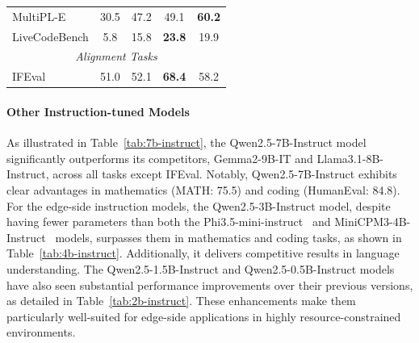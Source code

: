 \begin{table}[t]
\begin{tabular}{@{}lcccc@{}}
MultiPL-E & 30.5 & 47.2 & 49.1 & \textbf{60.2} \\

LiveCodeBench & 5.8 & 15.8 & \textbf{23.8} & 19.9 \\

\midrule

\multicolumn{5}{c}{\textit{Alignment Tasks}} \\

\midrule

IFEval & 51.0 & 52.1 & \textbf{68.4} & 58.2 \\

\bottomrule

\end{tabular}

\end{table}


\paragraph{Other Instruction-tuned Models} 
As illustrated in Table~\ref{tab:7b-instruct}, the Qwen2.5-7B-Instruct model significantly outperforms its competitors, Gemma2-9B-IT and Llama3.1-8B-Instruct, across all tasks except IFEval. Notably, Qwen2.5-7B-Instruct exhibits clear advantages in mathematics (MATH: 75.5) and coding (HumanEval: 84.8).
For the edge-side instruction models, the Qwen2.5-3B-Instruct model, despite having fewer parameters than both the Phi3.5-mini-instruct~\citep{phi3} and MiniCPM3-4B-Instruct~\citep{minicpm} models, surpasses them in mathematics and coding tasks, as shown in Table~\ref{tab:4b-instruct}. Additionally, it delivers competitive results in language understanding.
The Qwen2.5-1.5B-Instruct and Qwen2.5-0.5B-Instruct models have also seen substantial performance improvements over their previous versions, as detailed in Table~\ref{tab:2b-instruct}. These enhancements make them particularly well-suited for edge-side applications in highly resource-constrained environments.




